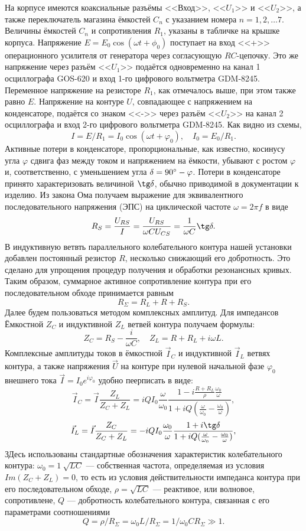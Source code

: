 \documentclass[a4paper, fontsize=14pt]{article}
\begin{document}
	На корпусе имеются коаксиальные разъёмы <<Вход>>, <<$U_1$>> и <<$U_2$>>, а также переключатель магазина ёмкостей $C_n$ с указанием номера $n = 1, 2, \ldots 7$. Величины ёмкостей $C_n$ и сопротивления $R_1$, указаны в табличке на крышке корпуса. Напряжение $E = E_0 \cos (\omega t + \phi_0)$ поступает на вход <<+>> операционного усилителя от генератора через согласующую $RC$-цепочку. Это же напряжение через разъём <<$U_1$>> подаётся одновременно на канал 1 осциллографа GOS-620 и вход 1-го цифрового вольтметра GDM-8245. Переменное напряжение на резисторе $R_1$, как отмечалось выше, при этом также равно $E$. Напряжение на контуре $U$, совпадающее с напряжением на конденсаторе, подаётся со знаком <<->> через разъём <<$U_2$>> на канал 2 осциллографа и вход 2-го цифрового вольтметра GDM-8245. Как видно из схемы,
	\[
		I = E / R_1 = I_0 \cos (\omega t + \varphi_0), \quad I_0 = E_0 / R_1.
	\]
	Активные потери в конденсаторе, пропорциональные, как известно, косинусу угла $\varphi$ сдвига фаз между током и напряжением на ёмкости, убывают с ростом $\varphi$ и, соответственно, с уменьшением угла $\delta = 90\degree - \varphi$. Потери в конденсаторе принято характеризовать величиной $\tg \delta$, обычно приводимой в документации к изделию. Из закона Ома получаем выражение для эквивалентного последовательного напряжения (ЭПС) на циклической частоте $\omega = 2 \pi f$ в виде
	\[
	R_S = \frac{U_{RS}}{I} = \frac{U_{RS}}{\omega C U_{CS}} = \frac{1}{\omega C} \tg \delta.
	\]
	В индуктивную ветвть параллельного колебательного контура нашей установки добавлен постоянный резистор $R$, несколько снижающий его добротность. Это сделано для упрощения процедур получения и обработки резонансных кривых. Таким образом, суммарное активное сопротивление контура при его последовательном обходе принимается равным
	\[
		R_\Sigma = R_L + R + R_S.
	\]
	Далее будем пользоваться методом комплексных амплитуд. Для импедансов Ёмкостной $Z_C$ и индуктивной $Z_L$ ветвей контура получаем формулы:
	\[
		Z_C = R_S - \frac{i}{\omega C}, \quad Z_L = R + R_L + i \omega L.
	\]
	Комплексные амплитуды токов в ёмкостной $\vec I_C$ и индуктивной $\vec I_L$ ветвях контура, а также напряжения $\vec U$ на контуре при нулевой начальной фазе $\varphi_0$ внешнего тока $\vec I = I_0 e^{i \varphi_0}$ удобно пеерписать в виде:
	\[
	\vec I_C = \vec I \frac{Z_L}{Z_C + Z_L} = iQI_0 \frac{\omega}{\omega_0} \frac{1 - i \frac{R + R_L}{\rho} \frac{\omega_0}{\omega}}{1 + iQ (\frac{\omega}{\omega_0} - \frac{\omega_0}{\omega})},
	\]
	\[\vec I_L = \vec I \frac{Z_C}{Z_C + Z_L} = -iQI_0 \frac{\omega_0}{\omega} \frac{1 + i \tg \delta}{1 + iQ(\frac{\omega}{\omega_0} - \frac{\omega_0}{\omega})},
	\]
	ЗДесь использованы стандартные обозначения характеристик колебательного контура: $\omega_0 = 1 \ \sqrt{LC}$ --- собственная частота, определяемая из условия $Im (Z_C + Z_L) = 0$, то есть из условия действительности импеданса контура при его последовательном обходе, $\rho = \sqrt{LC}$ --- реактивое, или волновое, сопротивлене, $Q$ --- добротность колебательного контура, связанная с его параметрами соотношениями
	\[
	Q = \rho / R_\Sigma = \omega_0 L / R_\Sigma = 1/\omega_0 C R_\Sigma \gg 1.
	\]
	\newpage
\end{document}
